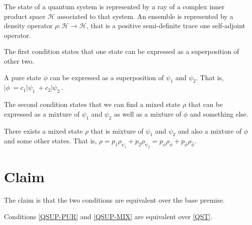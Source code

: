 \documentclass{article}
\begin{document}
\begin{condition}[QST]\label{QST}
	The state of a quantum system is represented by a ray of a complex inner product space $\mathcal{H}$ associated to that system. An ensemble is represented by a density operator $\rho : \mathcal{H} \to \mathcal{H}$, that is a positive semi-definite trace one self-adjoint operator.
\end{condition}

The first condition states that one state can be expressed as a superposition of other two.

\begin{condition}\label{QSUP-PUR}
	A pure state $\phi$ can be expressed as a superposition of $\psi_1$ and $\psi_2$. That is, $|\phi\> = c_1 |\psi_1\> + c_2 | \psi_2\>$.
\end{condition}

The second condition states that we can find a mixed state $\rho$ that can be expressed as a mixture of $\psi_1$ and $\psi_2$ as well as a mixture of $\phi$ and something else.

\begin{condition}\label{QSUP-MIX}
	There exists a mixed state $\rho$ that is mixture of $\psi_1$ and $\psi_2$ and also a mixture of $\phi$ and some other states. That is, $\rho = p_{1} \rho_{\psi_1} + p_{2} \rho_{\psi_2} = p_{\phi} \rho_{\phi} + p_{\hat{\phi}} \rho_{\hat{\phi}}$.
\end{condition}

\section{Claim}

The claim is that the two conditions are equivalent over the base premise.

\begin{claim}
	Conditions \ref{QSUP-PUR} and \ref{QSUP-MIX} are equivalent over \ref{QST}.
\end{claim}
\end{document}
